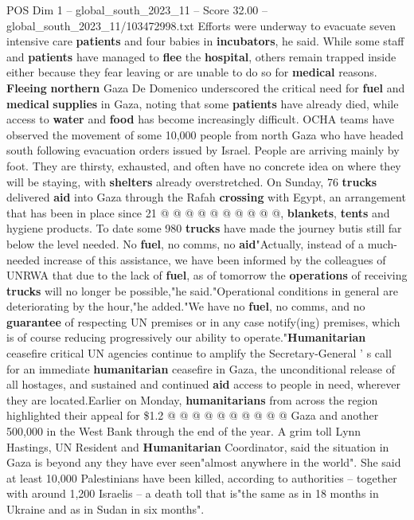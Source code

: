 \begin{textsample}{POS Dim 1 – global\_south\_2023\_11 – Score 32.00 – global\_south\_2023\_11/103472998.txt}
Efforts were underway to evacuate seven intensive care \textbf{patients} and four babies in \textbf{incubators}, he said.
While some staff and \textbf{patients} have managed to \textbf{flee} the \textbf{hospital}, others remain trapped inside either because they fear leaving or are unable to do so for \textbf{medical} reasons. \textbf{Fleeing} \textbf{northern} Gaza De Domenico underscored the critical need for \textbf{fuel} and \textbf{medical} \textbf{supplies} in Gaza, noting that some \textbf{patients} have already died, while access to \textbf{water} and \textbf{food} has become increasingly difficult.
OCHA teams have observed the movement of some 10,000 people from north Gaza who have headed south following evacuation orders issued by Israel.
People are arriving mainly by foot.
They are thirsty, exhausted, and often have no concrete idea on where they will be staying, with \textbf{shelters} already overstretched.
On Sunday, 76 \textbf{trucks} delivered \textbf{aid} into Gaza through the Rafah \textbf{crossing} with Egypt, an arrangement that has been in place since 21 @ @ @ @ @ @ @ @ @ @, \textbf{blankets}, \textbf{tents} and hygiene products.
To date some 980 \textbf{trucks} have made the journey butis still far below the level needed.
No \textbf{fuel}, no comms, no \textbf{aid}"Actually, instead of a much-needed increase of this assistance, we have been informed by the colleagues of UNRWA that due to the lack of \textbf{fuel}, as of tomorrow the \textbf{operations} of receiving \textbf{trucks} will no longer be possible,"he said."Operational conditions in general are deteriorating by the hour,"he added."We have no \textbf{fuel}, no comms, and no \textbf{guarantee} of respecting UN premises or in any case notify(ing) premises, which is of course reducing progressively our ability to operate."\textbf{Humanitarian} ceasefire critical UN agencies continue to amplify the Secretary-General ' s call for an immediate \textbf{humanitarian} ceasefire in Gaza, the unconditional release of all hostages, and sustained and continued \textbf{aid} access to people in need, wherever they are located.Earlier on Monday, \textbf{humanitarians} from across the region highlighted their appeal for \$1.2 @ @ @ @ @ @ @ @ @ @ Gaza and another 500,000 in the West Bank through the end of the year.
A grim toll Lynn Hastings, UN Resident and \textbf{Humanitarian} Coordinator, said the situation in Gaza is beyond any they have ever seen"almost anywhere in the world".
She said at least 10,000 Palestinians have been killed, according to authorities -- together with around 1,200 Israelis -- a death toll that is"the same as in 18 months in Ukraine and as in Sudan in six months".

\end{textsample}
